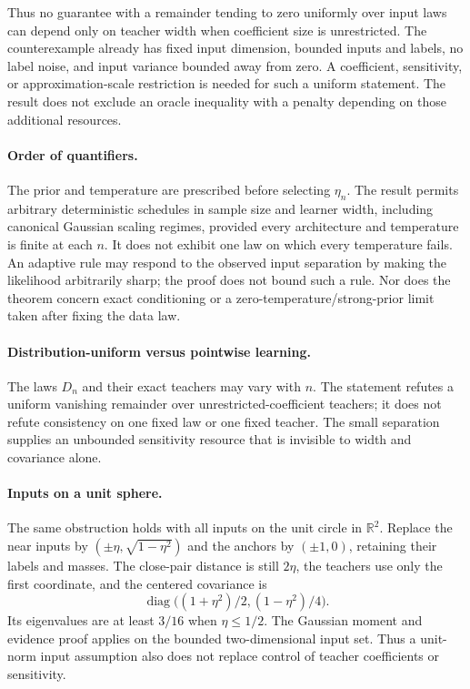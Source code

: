 Thus no guarantee with a remainder tending to zero uniformly over input laws can depend only on teacher width when coefficient size is unrestricted. The counterexample already has fixed input dimension, bounded inputs and labels, no label noise, and input variance bounded away from zero. A coefficient, sensitivity, or approximation-scale restriction is needed for such a uniform statement. The result does not exclude an oracle inequality with a penalty depending on those additional resources.

\paragraph{Order of quantifiers.}
The prior and temperature are prescribed before selecting $\eta_n$. The result permits arbitrary deterministic schedules in sample size and learner width, including canonical Gaussian scaling regimes, provided every architecture and temperature is finite at each $n$. It does not exhibit one law on which every temperature fails. An adaptive rule may respond to the observed input separation by making the likelihood arbitrarily sharp; the proof does not bound such a rule. Nor does the theorem concern exact conditioning or a zero-temperature/strong-prior limit taken after fixing the data law.

\paragraph{Distribution-uniform versus pointwise learning.}
The laws $D_n$ and their exact teachers may vary with $n$. The statement refutes a uniform vanishing remainder over unrestricted-coefficient teachers; it does not refute consistency on one fixed law or one fixed teacher. The small separation supplies an unbounded sensitivity resource that is invisible to width and covariance alone.


\paragraph{Inputs on a unit sphere.}
The same obstruction holds with all inputs on the unit circle in $\mathbb R^2$. Replace the near inputs by $(\pm\eta,\sqrt{1-\eta^2})$ and the anchors by $(\pm1,0)$, retaining their labels and masses. The close-pair distance is still $2\eta$, the teachers use only the first coordinate, and the centered covariance is
\[
 \operatorname{diag}\bigl((1+\eta^2)/2,(1-\eta^2)/4\bigr).
\]
Its eigenvalues are at least $3/16$ when $\eta\le1/2$. The Gaussian moment and evidence proof applies on the bounded two-dimensional input set. Thus a unit-norm input assumption also does not replace control of teacher coefficients or sensitivity.
